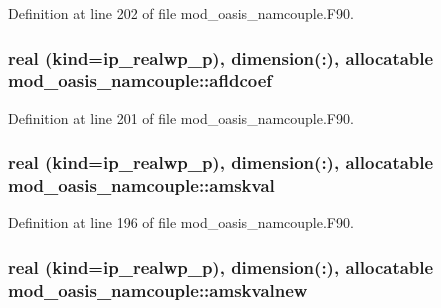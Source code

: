 Definition at line 202 of file mod\+\_\+oasis\+\_\+namcouple.\+F90.

\hypertarget{classmod__oasis__namcouple_a19fb86d643bb8761d5a8e32d645d5963}{
\subsubsection[{afldcoef}]{\setlength{\rightskip}{0pt plus 5cm}real (kind=ip\+\_\+realwp\+\_\+p), dimension(\+:), allocatable mod\+\_\+oasis\+\_\+namcouple\+::afldcoef\hspace{0.3cm}{\ttfamily [private]}}}\label{classmod__oasis__namcouple_a19fb86d643bb8761d5a8e32d645d5963}


Definition at line 201 of file mod\+\_\+oasis\+\_\+namcouple.\+F90.

\hypertarget{classmod__oasis__namcouple_a92d43fa5eaaff81f0e3f73b303377c02}{
\subsubsection[{amskval}]{\setlength{\rightskip}{0pt plus 5cm}real (kind=ip\+\_\+realwp\+\_\+p), dimension(\+:), allocatable mod\+\_\+oasis\+\_\+namcouple\+::amskval\hspace{0.3cm}{\ttfamily [private]}}}\label{classmod__oasis__namcouple_a92d43fa5eaaff81f0e3f73b303377c02}


Definition at line 196 of file mod\+\_\+oasis\+\_\+namcouple.\+F90.

\hypertarget{classmod__oasis__namcouple_a3598202174da65117caf675065f8b160}{
\subsubsection[{amskvalnew}]{\setlength{\rightskip}{0pt plus 5cm}real (kind=ip\+\_\+realwp\+\_\+p), dimension(\+:), allocatable mod\+\_\+oasis\+\_\+namcouple\+::amskvalnew\hspace{0.3cm}{\ttfamily [private]}}}\label{classmod__oasis__namcouple_a3598202174da65117caf675065f8b160}


